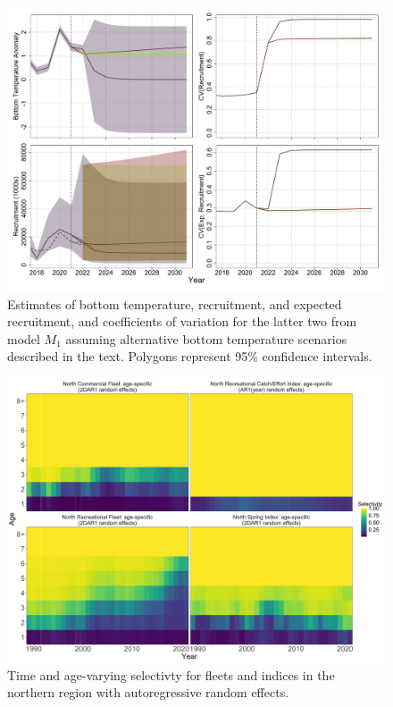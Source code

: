 \documentclass[
]{article}
\begin{document}
\begin{figure}

{\centering \includegraphics[height=0.95\textheight]{R_proj_results} 

}

\caption{Estimates of bottom temperature, recruitment, and expected recruitment, and coefficients of variation for the latter two from model $M_1$ assuming alternative bottom temperature scenarios described in the text. Polygons represent 95\% confidence intervals.}\label{fig:R-BT-proj}
\end{figure}

\pagebreak

\begin{figure}

{\centering \includegraphics[height=0.95\textheight]{selectivity_re_plot} 

}

\caption{Time and age-varying selectivty for fleets and indices in the northern region with autoregressive random effects.}\label{fig:selectivity-re}
\end{figure}
\pagebreak
\end{document}
